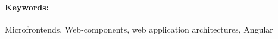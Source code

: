 \documentclass[12pt, oneside]{book}  %
\begin{document}
\paragraph*{Keywords:} Microfrontends, Web-components, web application architectures, Angular

%
%
%
%



\newpage 

\tableofcontents



\newpage 

\listoffigures
\listoftables


\mainmatter
\pagestyle{headings}

 






%



\newpage	

\backmatter

\thispagestyle{empty}
\clearpage


 

 
\end{document}

